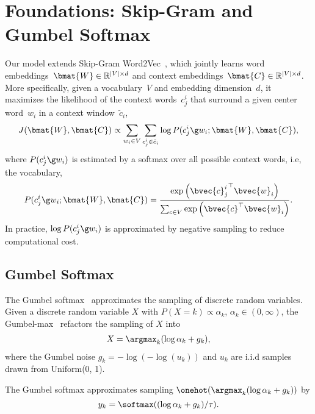 
\section{Foundations: Skip-Gram and Gumbel Softmax}
\label{sec:skip-gram}

Our model extends Skip-Gram
Word2Vec~\citep{mikolov2013a,mikolov2013b}, which
jointly learns word embeddings~$\bmat{W} \in \mathbb{R}^{|V|\times d}$
and context embeddings~$\bmat{C} \in \mathbb{R}^{|V|\times d}$. More specifically, given a
 vocabulary~$V$ and  embedding dimension~$d$, it
maximizes the likelihood of the context words~$c_{j}^i$ that
surround a given center word~$w_i$ in a context window~$\tilde{c}_i$,
\begin{equation}
 J(\bmat{W}, \bmat{C}) \propto \sum_{w_i \in V}\sum_{c_{j} ^i\in \tilde{c}_i} \log P(c_{j}^i \g w_i; \bmat{W}, \bmat{C}),
\label{eq:obj_sg}
\end{equation}
where $P(c_{j}^i\g w_i)$ is estimated by a softmax over all possible
context words, i.e, the vocabulary,
 \begin{equation}
 	P(c_{j}^i \g w_i; \bmat{W}, \bmat{C}) = \frac{ \exp \left({\bvec{c}_j^i} ^{\top} \bvec{w}_i\right)}{\sum_{c \in V}  \exp \left(\bvec{c}^{\top}\bvec{w}_i\right)}.
 \label{eq:sg_softmax}
 \end{equation}
In practice, $\log P(c_{j}^i \g w_i)$ is approximated by
negative sampling to reduce computational cost.

\subsection{Gumbel Softmax}
\label{sec:gs}

The Gumbel softmax~\citep{jang2016categorical,maddison2016concrete}
approximates the sampling of discrete random variables.  Given a
discrete random variable $X$ with $P(X=k) \propto \alpha_k$, $\alpha_k
\in (0, \infty)$, the
Gumbel-max~\citep{gumbel1954statistical,maddison2014sampling} refactors
the sampling of $X$ into
\begin{eqnarray}
X = \argmax_k (\log \alpha_k + g_k),
\end{eqnarray}
where the Gumbel noise $g_k = -\log(-\log(u_k))$ and $u_k$ are i.i.d
samples drawn from Uniform(0, 1).

The Gumbel softmax approximates sampling $
\onehot(\argmax_k (\log \alpha_k + g_k))$ by
 \begin{equation}
y_k = \softmax((\log \alpha_k  + g_k)/\tau).
 \end{equation}